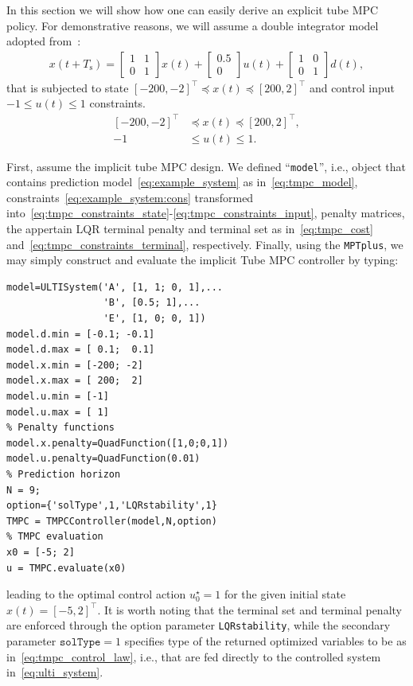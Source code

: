 \documentclass[letterpaper, 10 pt, conference]{ieeeconf}
\begin{document}
In this section we will show how one can easily derive an explicit tube MPC policy. For demonstrative reasons, we will assume a double integrator model adopted from~\cite{MS05}:
\begin{eqnarray}
	\label{eq:example_system}
	x(t+T_\text{s}) = 
	\begin{bmatrix}
		1 & 1 \\
		0 & 1 
	\end{bmatrix} 
	x(t) + 
	\begin{bmatrix}
		0.5 \\
		0  
	\end{bmatrix}
	u(t) + 
	\begin{bmatrix}
		1 & 0 \\
		0 & 1 
	\end{bmatrix}
	d(t) ,
\end{eqnarray}
that is subjected to state $[-200, -2]^{\top} \preceq x(t) \preceq [200, 2]^{\top}$ and control input $-1 \leq u(t) \leq 1$ constraints.
\begin{subequations}
	\label{eq:example_system:cons}
	\begin{align}
		[-200, -2]^{\top} &\preceq x(t) \preceq [200, 2]^{\top}, \\
		-1 &\leq u(t) \leq 1.
	\end{align}
\end{subequations}



First, assume the implicit tube MPC design. We defined ``\verb|model|'', i.e., object that contains prediction model~\eqref{eq:example_system} as in~\eqref{eq:tmpc_model}, constraints~\eqref{eq:example_system:cons} transformed into~\eqref{eq:tmpc_constraints_state}-\eqref{eq:tmpc_constraints_input}, penalty matrices, the appertain LQR terminal penalty and terminal set as in~\eqref{eq:tmpc_cost} and~\eqref{eq:tmpc_constraints_terminal}, respectively. 
Finally, using the \texttt{MPTplus}, we may simply construct and evaluate the implicit Tube MPC controller by typing:
\begin{lstlisting}[style=Matlab-editor]
model=ULTISystem('A', [1, 1; 0, 1],...
                 'B', [0.5; 1],...
                 'E', [1, 0; 0, 1])
model.d.min = [-0.1; -0.1] 
model.d.max = [ 0.1;  0.1]
model.x.min = [-200; -2]
model.x.max = [ 200;  2]
model.u.min = [-1]
model.u.max = [ 1]
% Penalty functions
model.x.penalty=QuadFunction([1,0;0,1])
model.u.penalty=QuadFunction(0.01)
% Prediction horizon
N = 9;
option={'solType',1,'LQRstability',1}
TMPC = TMPCController(model,N,option)
% TMPC evaluation
x0 = [-5; 2]
u = TMPC.evaluate(x0)
\end{lstlisting}
leading to the optimal control action $u_{0}^{\star} = 1$ for the given initial state $x(t) = [-5, 2]^\top$.
It is worth noting that the terminal set and terminal penalty are enforced through the option parameter \texttt{LQRstability}, while the secondary parameter $\texttt{solType} = 1$ specifies type of the returned optimized variables to be as in~\eqref{eq:tmpc_control_law}, i.e., that are fed directly to the controlled system in~\eqref{eq:ulti_system}.
\end{document}
